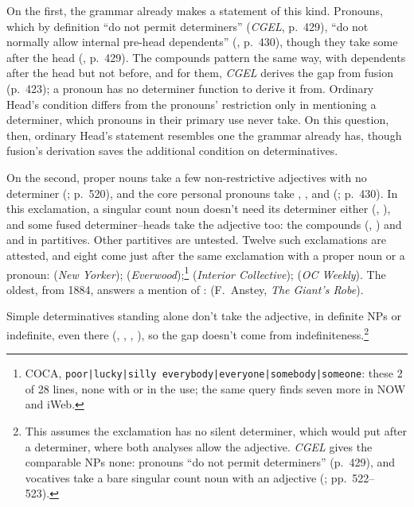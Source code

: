 On the first, the grammar already makes a statement of this kind. Pronouns, which by definition \enquote{do not permit determiners} (\textit{CGEL}, p.~429), \enquote{do not normally allow internal pre-head dependents} (, p.~430), though they take some after the head (, p.~429). The compounds pattern the same way, with dependents after the head but not before, and for them, \textit{CGEL} derives the gap from fusion (p.~423); a pronoun has no determiner function to derive it from. Ordinary Head's condition differs from the pronouns' restriction only in mentioning a determiner, which pronouns in their primary use never take. On this question, then, ordinary Head's statement resembles one the grammar already has, though fusion's derivation saves the additional condition on determinatives.

On the second, proper nouns take a few non-restrictive adjectives with no determiner (; p.~520), and the core personal pronouns take , , and  (; p.~430). In this exclamation, a singular count noun doesn't need its determiner either (, ), and some fused determiner--heads take the adjective too: the compounds (, ) and  and  in partitives. Other partitives are untested. Twelve such exclamations are attested, and eight come just after the same exclamation with a proper noun or a pronoun:  (\textit{New Yorker});  (\textit{Everwood});\footnote{COCA, \texttt{poor|lucky|silly everybody|everyone|somebody|someone}: these 2 of 28 lines, none with  or  in the use; the same query finds seven more in NOW and iWeb.}  (\textit{Interior Collective});  (\textit{OC Weekly}). The oldest, from 1884, answers a mention of :  (F.~Anstey, \textit{The Giant's Robe}).

Simple determinatives standing alone don't take the adjective, in definite NPs or indefinite, even there (, , , ), so the gap doesn't come from indefiniteness.\footnote{This assumes the exclamation has no silent determiner, which would put  after a determiner, where both analyses allow the adjective. \textit{CGEL} gives the comparable NPs none: pronouns \enquote{do not permit determiners} (p.~429), and vocatives take a bare singular count noun with an adjective (; pp.~522--523).}

